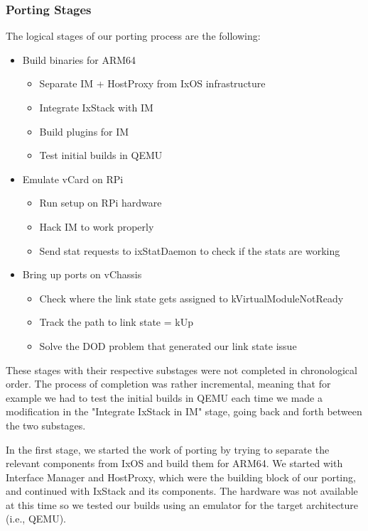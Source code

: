 \subsubsection{Porting Stages}

The logical stages of our porting process are the following:
\begin{itemize}
    \item Build binaries for ARM64
    \begin{itemize}
        \item Separate IM + HostProxy from IxOS infrastructure
        \item Integrate IxStack with IM
        \item Build plugins for IM
        \item Test initial builds in QEMU
    \end{itemize}
    \item Emulate vCard on RPi
    \begin{itemize}
        \item Run setup on RPi hardware
        \item Hack IM to work properly
        \item Send stat requests to ixStatDaemon to check if the stats are working
    \end{itemize}
    \item Bring up ports on vChassis
    \begin{itemize}
        \item Check where the link state gets assigned to kVirtualModuleNotReady
        \item Track the path to link state = kUp
        \item Solve the DOD problem that generated our link state issue
    \end{itemize}
\end{itemize}
These stages with their respective substages were not completed in chronological
order. The process of completion was rather incremental, meaning that for
example we had to test the initial builds in QEMU each time we made a
modification in the "Integrate IxStack in IM" stage, going back and forth
between the two substages.

In the first stage, we started the work of porting by trying to separate the
relevant components from IxOS and build them for ARM64. We started with
Interface Manager and HostProxy, which were the building block of our porting,
and continued with IxStack and its components. The hardware was not available
at this time so we tested our builds using an emulator for the target
architecture (i.e., QEMU).


